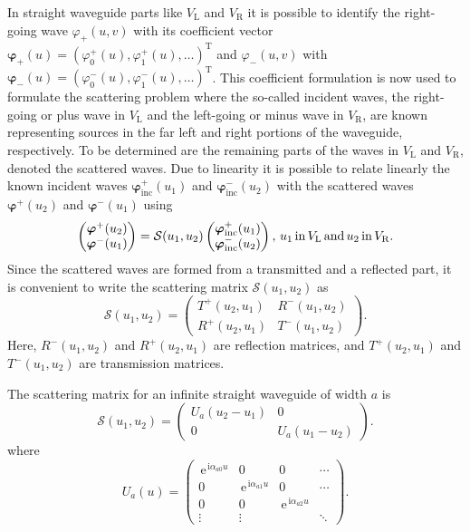 \documentclass[numreferences]{kluwer}
\renewcommand{\phi}{\varphi}
\renewcommand{\vec}[1]{\bm{#1}}
\renewcommand{\i}{\,\mathrm{i}}
\newcommand{\e}{\,\mathrm{e}}
\begin{document}
In straight waveguide parts like $V_{\text{L}}$ and $V_{\text{R}}$ it
is possible to identify the right-going wave $ \phi_{+}(u,v)$ with its
coefficient vector $
\bm{\phi}_{+}(u)=(\phi_{0}^{+}(u),\phi_{1}^{+}(u),\ldots)^{\text{T}}$
and $ \phi_{-}(u,v)$ with $
\bm{\phi}_{-}(u)=(\phi_{0}^{-}(u),\phi_{1}^{-}(u),\ldots)^{\text{T}}$. This
coefficient formulation is now used to formulate the scattering
problem where the so-called incident waves, the right-going or plus
wave in $V_{\text{L}}$ and the left-going or minus wave in
$V_{\text{R}}$, are known representing sources in the far left and
right portions of the waveguide, respectively. To be determined are
the remaining parts of the waves in $V_{\text{L}}$ and $V_{\text{R}}$,
denoted the scattered waves. Due to linearity it is possible to relate
linearly the known incident waves $\bm{\phi}_{\text{inc}}^{+}(u_1)$
and $\bm{\phi}_{\text{inc}}^{-}(u_2)$ with the scattered waves
$\bm{\phi}^{+}(u_2)$ and $\bm{\phi}^{-}(u_1)$ using
\begin{equation}
  \label{107}
  \begin{pmatrix}
    \vec \phi^+(u_2)\\
    \vec \phi^-(u_1)
  \end{pmatrix}= \mathcal{S}(u_1,u_2)
  \begin{pmatrix}
    \vec \phi_{\text{inc}}^+(u_1)\\
    \vec \phi_{\text{inc}}^-(u_2)
  \end{pmatrix},\, u_1\, {\rm in}\, V_{\rm L}\, {\rm and}\, u_2\, {\rm
    in}\, V_{\rm R}.
\end{equation}
Since the scattered waves are formed from a transmitted and a
reflected part, it is convenient to write the scattering matrix $
\mathcal{S}(u_1,u_2)$ as
\begin{equation}
  \label{108}
  \mathcal{S}(u_1,u_2)=
  \begin{pmatrix}
    T^+(u_2,u_1)& R^-(u_1,u_2)\\
    R^+(u_2,u_1)& T^-(u_1,u_2)
  \end{pmatrix}
  .
\end{equation}
Here, $R^-(u_1,u_2)$ and $R^+(u_2,u_1)$ are reflection matrices, and
$T^+(u_2,u_1)$ and $T^-(u_1,u_2)$ are transmission matrices.

The scattering matrix for an infinite straight waveguide of width $a$
is
\begin{equation}
  \label{109}
  \mathcal{S}(u_1,u_2)=
  \begin{pmatrix}
    U_a(u_2-u_1)&0\\
    0&U_a(u_1-u_2)
  \end{pmatrix}
  .
\end{equation}
where
\begin{equation}
  \label{eq:S}
  U_a(u)=
  \begin{pmatrix}
    \e^{\i\alpha_{a0}u}&0&0&\cdots\\
    0&\e^{\i\alpha_{a1}u}&0&\cdots\\
    0&0&\e^{\i\alpha_{a2}u}&\\
    \vdots&\vdots&&\ddots
  \end{pmatrix}.
\end{equation}
\end{document}
